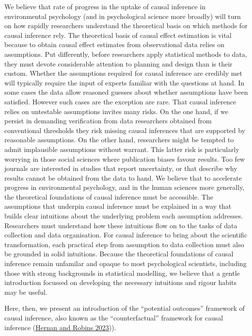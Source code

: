 \documentclass[
  singlecolumn]{article}
\begin{document}
We believe that rate of progress in the uptake of causal inference in
environmental psychology (and in psychological science more broadly)
will turn on how rapidly researchers understand the theoretical basis on
which methods for causal inference rely. The theoretical basis of causal
effect estimation is vital because to obtain causal effect estimates
from observational data relies on assumptions. Put differently, before
researchers apply statistical methods to data, they must devote
considerable attention to planning and design than is their custom.
Whether the assumptions required for causal inference are credibly met
will typically require the input of experts familiar with the questions
at hand. In some cases the data allow reasoned guesses about whether
assumptions have been satisfied. However such cases are the exception
are rare. That causal inference relies on untestable assumptions invites
many risks. On the one hand, if we persist in demanding verification
from data researchers obtained from conventional thresholds they risk
missing causal inferences that are supported by reasonable assumptions.
On the other hand, researchers might be tempted to admit implausible
assumptions without warrant. This latter risk is particularly worrying
in those social sciences where publication biases favour results. Too
few journals are interested in studies that report uncertainty, or that
describe why results cannot be obtained from the data to hand. We
believe that to accelerate progress in environmental psychology, and in
the human sciences more generally, the theoretical foundations of causal
inference must be accessible. The assumptions that underpin causal
inference must be explained in a way that builds clear intuitions about
the underlying problem each assumption addresses. Researchers must
understand how these intuitions flow on to the tasks of data collection
and data organisation. For causal inference to bring about the
scientific transformation, each practical step from assumption to data
collection must also be grounded in solid intuitions. Because the
theoretical foundations of causal inference remain unfamilar and opaque
to most psychological scientists, including those with strong
backgrounds in statistical modelling, we believe that a gentle
introduction focussed on developing the necessary intuitions and rigour
habits may be useful.

Here, then, we present an introduction of the ``potential outcomes''
framework of causal inference, also known as the ``counterfactual''
framework for causal inference
(\protect\hyperlink{ref-hernan2023}{Hernan and Robins 2023})).
\end{document}
